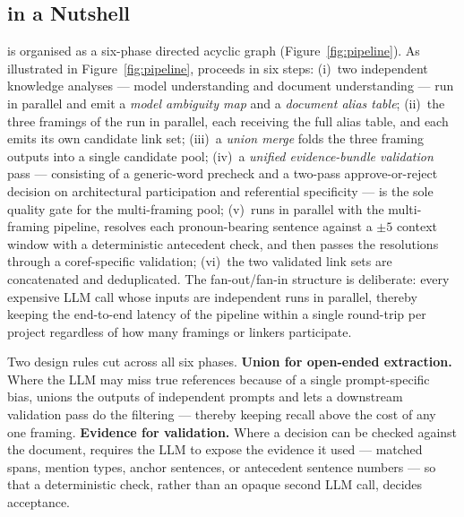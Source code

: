 \subsection{\approach in a Nutshell}\label{sec:nutshell}

\approach is organised as a six-phase directed acyclic graph
(Figure~\ref{fig:pipeline}).
As illustrated in Figure~\ref{fig:pipeline}, \approach proceeds in
six steps:
(i)~two independent knowledge analyses --- model understanding and
document understanding --- run in parallel and emit a
\emph{model ambiguity map} and a \emph{document alias table};
(ii)~the three framings of the \multiframing run in parallel, each
receiving the full alias table, and each emits its own candidate
link set;
(iii)~a \emph{union merge} folds the three framing outputs into a
single candidate pool;
(iv)~a \emph{unified evidence-bundle validation} pass --- consisting
of a generic-word precheck and a two-pass approve-or-reject decision
on architectural participation and referential specificity --- is the
sole quality gate for the multi-framing pool;
(v)~\coref runs in parallel with the multi-framing pipeline, resolves
each pronoun-bearing sentence against a $\pm 5$ context window with
a deterministic antecedent check, and then passes the resolutions
through a coref-specific validation;
(vi)~the two validated link sets are concatenated and deduplicated.
The fan-out/fan-in structure is deliberate: every expensive LLM call
whose inputs are independent runs in parallel, thereby keeping the
end-to-end latency of the pipeline within a single round-trip per
project regardless of how many framings or linkers participate.

Two design rules cut across all six phases.
\textbf{Union for open-ended extraction.}
Where the LLM may miss true references because of a single
prompt-specific bias, \approach unions the outputs of independent
prompts and lets a downstream validation pass do the filtering ---
thereby keeping recall above the cost of any one framing.
\textbf{Evidence for validation.}
Where a decision can be checked against the document, \approach
requires the LLM to expose the evidence it used --- matched spans,
mention types, anchor sentences, or antecedent sentence numbers ---
so that a deterministic check, rather than an opaque second LLM call,
decides acceptance.

